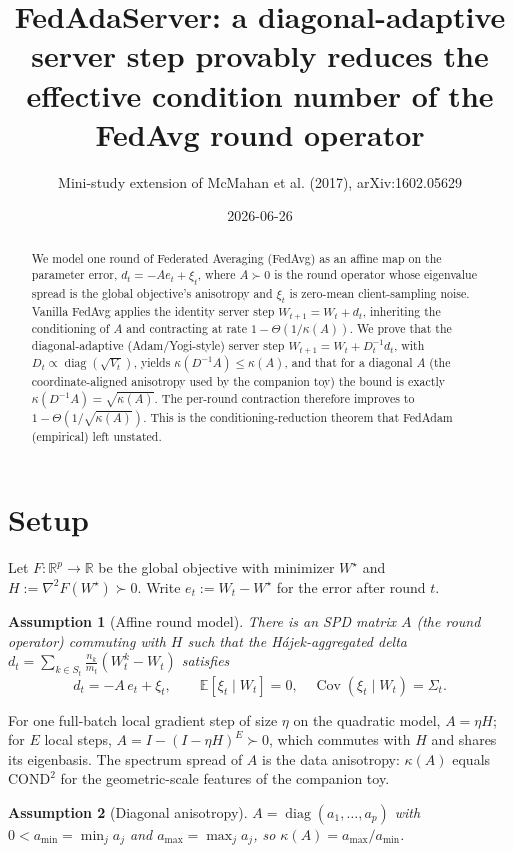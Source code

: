 \documentclass[11pt]{article}
\title{FedAdaServer: a diagonal-adaptive server step provably reduces the
effective condition number of the FedAvg round operator}
\author{Mini-study extension of McMahan et al. (2017), arXiv:1602.05629}
\date{2026-06-26}
\newtheorem{assumption}{Assumption}
\theoremstyle{definition}
\DeclareMathOperator{\diag}{diag}
\DeclareMathOperator{\Cov}{Cov}
\newcommand{\E}{\mathbb{E}}
\newcommand{\R}{\mathbb{R}}
\newcommand{\Ws}{W^\star}
\begin{document}
\maketitle

\begin{abstract}
We model one round of Federated Averaging (FedAvg) as an affine map on the
parameter error, $d_t = -A e_t + \xi_t$, where $A\succ0$ is the round operator
whose eigenvalue spread is the global objective's anisotropy and $\xi_t$ is
zero-mean client-sampling noise. Vanilla FedAvg applies the identity server step
$W_{t+1}=W_t+d_t$, inheriting the conditioning of $A$ and contracting at rate
$1-\Theta(1/\kappa(A))$. We prove that the diagonal-adaptive (Adam/Yogi-style)
server step $W_{t+1}=W_t+D_t^{-1}d_t$, with $D_t\propto\diag(\sqrt{V_t})$, yields
$\kappa(D^{-1}A)\le\kappa(A)$, and that for a diagonal $A$ (the coordinate-aligned
anisotropy used by the companion toy) the bound is exactly
$\kappa(D^{-1}A)=\sqrt{\kappa(A)}$. The per-round contraction therefore improves
to $1-\Theta(1/\sqrt{\kappa(A)})$. This is the conditioning-reduction theorem that
FedAdam (empirical) left unstated.
\end{abstract}

\section{Setup}

Let $F:\R^p\to\R$ be the global objective with minimizer $\Ws$ and
$H:=\nabla^2F(\Ws)\succ0$. Write $e_t:=W_t-\Ws$ for the error after round $t$.

\begin{assumption}[Affine round model]\label{ass:affine}
There is an SPD matrix $A$ (the \emph{round operator}) commuting with $H$ such
that the H\'ajek-aggregated delta
$d_t=\sum_{k\in S_t}\frac{n_k}{m_t}(W_t^k-W_t)$ satisfies
\[
  d_t = -A\,e_t + \xi_t,\qquad \E[\xi_t\mid W_t]=0,\quad \Cov(\xi_t\mid W_t)=\Sigma_t.
\]
\end{assumption}

\noindent For one full-batch local gradient step of size $\eta$ on the quadratic
model, $A=\eta H$; for $E$ local steps, $A=I-(I-\eta H)^E\succ0$, which commutes
with $H$ and shares its eigenbasis. The spectrum spread of $A$ is the data
anisotropy: $\kappa(A)$ equals $\mathrm{COND}^2$ for the geometric-scale features of
the companion toy.

\begin{assumption}[Diagonal anisotropy]\label{ass:diag}
$A=\diag(a_1,\dots,a_p)$ with $0<a_{\min}=\min_j a_j$ and $a_{\max}=\max_j a_j$,
so $\kappa(A)=a_{\max}/a_{\min}$.
\end{assumption}
\end{document}
